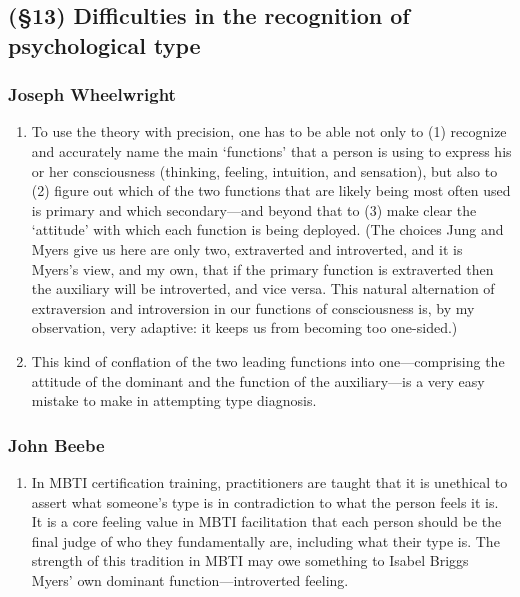 \subsection{(\S13) Difficulties in the recognition of psychological type}

\subsubsection{Joseph Wheelwright}

\begin{enumerate}

\item {} To use the theory
with precision, one has to be able not only to (1) recognize and accurately
name the main ‘functions’ that a person is using to express his or her
consciousness (thinking, feeling, intuition, and sensation), but also to (2)
figure out which of the two functions that are likely being most often used is
primary and which secondary—and beyond that to (3) make clear the ‘attitude’
with which each function is being deployed. (The choices Jung and Myers give us
here are only two, extraverted and introverted, and it is Myers’s view, and my
own, that if the primary function is extraverted then the auxiliary will be
introverted, and vice versa. This natural alternation of extraversion and
introversion in our functions of consciousness is, by my observation, very
adaptive: it keeps us from becoming too one-sided.)

\item {}
This kind of conflation of the two leading functions into one—comprising the
attitude of the dominant and the function of the auxiliary—is a very easy
mistake to make in attempting type diagnosis.

\end{enumerate}

\subsubsection{John Beebe}

\begin{enumerate}

\item {}
In MBTI certification training, practitioners are taught that it is unethical
to assert what someone’s type is in contradiction to what the person feels it
is. It is a core feeling value in MBTI facilitation that each person should be
the final judge of who they fundamentally are, including what their type is.
The strength of this tradition in MBTI may owe something to Isabel Briggs
Myers’ own dominant function—introverted feeling.

\end{enumerate}

